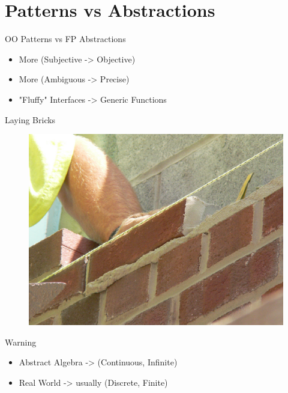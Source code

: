 \documentclass[compress]{beamer}
\begin{document}
\section{Patterns vs Abstractions}

\begin{frame}{OO Patterns vs FP Abstractions}
  \begin{itemize}
    \item \Large{More (Subjective -> Objective)} \newline
    \item \Large{More (Ambiguous -> Precise)} \newline
    \item \Large{"Fluffy" Interfaces -> Generic Functions}
  \end{itemize}
\end{frame}

\begin{frame}{Laying Bricks}
  \begin{figure}
    \centering
    \includegraphics[width=\linewidth]{assets/layingbricks.jpg}
  \end{figure}
\end{frame}

\begin{frame}{Warning}
  \begin{itemize}
    \item \Large{Abstract Algebra -> (Continuous, Infinite)} \newline
    \item \Large{Real World -> usually (Discrete, Finite)}
  \end{itemize}
\end{frame}
\end{document}
